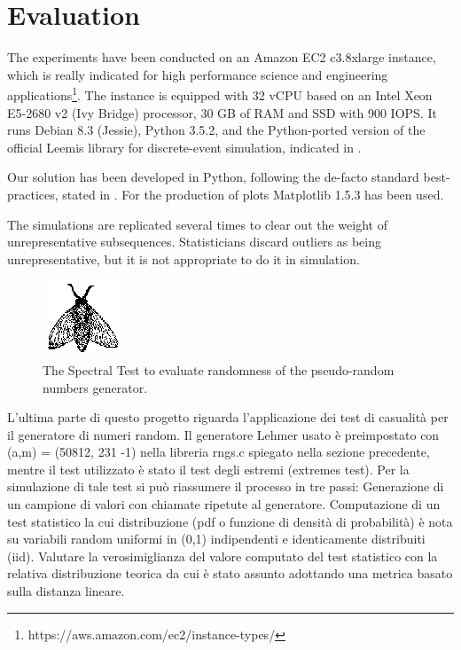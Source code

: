 \section{Evaluation}
\label{sec:evaluation}

The experiments have been conducted on an Amazon EC2 c3.8xlarge instance, which is really indicated for high performance science and engineering applications\footnote{https://aws.amazon.com/ec2/instance-types/}.
The instance is equipped with 32 vCPU based on an Intel Xeon E5-2680 v2 (Ivy Bridge) processor, 30 GB of RAM and SSD with 900 IOPS.
It runs Debian 8.3 (Jessie), Python 3.5.2, and the Python-ported version of the official Leemis library for discrete-event simulation, indicated in \cite{leemis2006discrete}.

Our solution has been developed in Python, following the de-facto standard best-practices, stated in \cite{reitz2016,GooglePythonStyleguide}. For the production of plots Matplotlib 1.5.3 has been used.

The simulations are replicated several times to clear out the weight of unrepresentative subsequences.
Statisticians discard outliers as being unrepresentative, but it is not appropriate to do it in simulation.

\lipsum[1]

\begin{figure}
  \label{fig:experimental-analysis-randomness-spectral}
  \includegraphics{fig/fly}
  \caption{The Spectral Test to evaluate randomness of the pseudo-random numbers generator.}
\end{figure}


L’ultima parte di questo progetto riguarda l’applicazione dei test di casualità per il generatore di numeri random. Il generatore Lehmer usato è preimpostato con (a,m) = (50812, 231 -1) nella libreria rngs.c spiegato nella sezione precedente, mentre il test utilizzato è stato il test degli estremi (extremes test).
Per la simulazione di tale test si può riassumere il processo in tre passi:
Generazione di un campione di valori con chiamate ripetute al generatore.
Computazione di un test statistico la cui distribuzione (pdf o funzione di densità di probabilità) è nota su variabili random uniformi in (0,1) indipendenti e identicamente distribuiti (iid).
Valutare la verosimiglianza del valore computato del test statistico con la relativa distribuzione teorica da cui è stato assunto adottando una metrica basato sulla distanza lineare.

